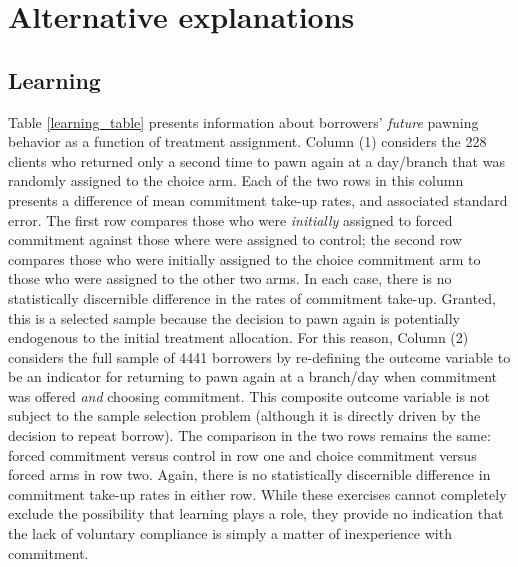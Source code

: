 \newpage
\section{Alternative explanations}

\vspace{.2in}
\subsection{Learning}
\normalsize
Table \ref{learning_table} presents information about borrowers' \emph{future} pawning behavior as a function of treatment assignment. Column (1) considers the 228 clients who returned only a second time to pawn again at a day/branch that was randomly assigned to the choice arm. Each of the two rows in this column presents a difference of mean commitment take-up rates, and associated standard error. The first row compares those who were \emph{initially} assigned to forced commitment against those where were assigned to control; the second row compares those who were initially assigned to the choice commitment arm to those who were assigned to the other two arms. In each case, there is no statistically discernible difference in the rates of commitment take-up. Granted, this is a selected sample because the decision to pawn again is potentially endogenous to the initial treatment allocation. For this reason, Column (2) considers the full sample of 4441 borrowers by re-defining the outcome variable to be an indicator for returning to pawn again at a branch/day when commitment was offered \emph{and} choosing commitment. This composite outcome variable is not subject to the sample selection problem (although it is directly driven by the decision to repeat borrow). The comparison in the two rows remains the same: forced commitment versus control in row one and choice commitment versus forced arms in row two. Again, there is no statistically discernible difference in commitment take-up rates in either row. While these exercises cannot completely exclude the possibility that learning plays a role, they provide no indication that the lack of voluntary compliance is simply a matter of inexperience with commitment.

